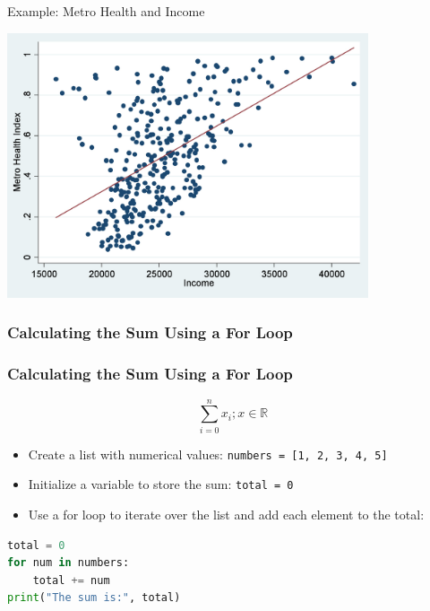 \documentclass{beamer}
\begin{document}
    \begin{frame}{Example: Metro Health and Income}
        \begin{center}
            \includegraphics[width=0.8\textwidth]{figures/scatter_ex_atlanticcities.jpg}
        \end{center}
    \end{frame}
    \subsubsection{Calculating the Sum Using a For Loop}
    \begin{frame}[fragile]
        \frametitle{Calculating the Sum Using a For Loop}
        \begin{equation*}
            \sum_{i=0}^{n} x_{i}; x \in \mathbb{R}
        \end{equation*}
        \begin{itemize}
            \item Create a list with numerical values: \texttt{numbers = [1, 2, 3, 4, 5]}
            \item Initialize a variable to store the sum: \texttt{total = 0}
            \item Use a for loop to iterate over the list and add each element to the total:
        \end{itemize}
        \begin{lstlisting}[language=Python]
total = 0
for num in numbers:
    total += num
print("The sum is:", total)
        \end{lstlisting}
    \end{frame}
\end{document}
